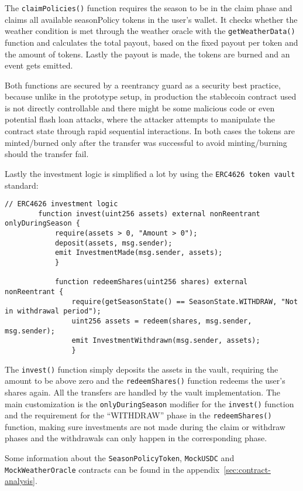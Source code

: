 \documentclass[11pt,a4paper]{article}
\begin{document}
		The \texttt{claimPolicies()} function requires the season to be in the claim phase and claims all available seasonPolicy tokens in the user's wallet.
		It checks whether the weather condition is met through the weather oracle with the \texttt{getWeatherData()} function and calculates the total payout, based on the fixed payout per token and the amount of tokens.
		Lastly the payout is made, the tokens are burned and an event gets emitted.

		Both functions are secured by a reentrancy guard as a security best practice, because unlike in the prototype setup, in production the stablecoin contract used is not directly controllable and there might be some malicious code or even potential flash loan attacks, where the attacker attempts to manipulate the contract state through rapid sequential interactions.
		In both cases the tokens are minted/burned only after the transfer was successful to avoid minting/burning should the transfer fail.

		Lastly the investment logic is simplified a lot by using the \texttt{ERC4626 token vault} standard:

		\begin{lstlisting}[style=soliditystyle, caption={Excerpt: RainyDayFund.sol - Investor Functions},label={lst:contract-invest}]
		// ERC4626 investment logic
		function invest(uint256 assets) external nonReentrant onlyDuringSeason {
			require(assets > 0, "Amount > 0");
			deposit(assets, msg.sender);
			emit InvestmentMade(msg.sender, assets);
			}

			function redeemShares(uint256 shares) external nonReentrant {
				require(getSeasonState() == SeasonState.WITHDRAW, "Not in withdrawal period");
				uint256 assets = redeem(shares, msg.sender, msg.sender);
				emit InvestmentWithdrawn(msg.sender, assets);
				}
		\end{lstlisting}

		The \texttt{invest()} function simply deposits the assets in the vault, requiring the amount to be above zero and the \texttt{redeemShares()} function redeems the user's shares again.
		All the transfers are handled by the vault implementation.
		The main customization is the \texttt{onlyDuringSeason} modifier for the \texttt{invest()} function and the requirement for the \enquote{WITHDRAW} phase in the \texttt{redeemShares()} function, making sure investments are not made during the claim or withdraw phases and the withdrawals can only happen in the corresponding phase.

		Some information about the \texttt{SeasonPolicyToken}, \texttt{MockUSDC} and \texttt{MockWeatherOracle} contracts can be found in the appendix~\ref{sec:contract-analysis}.
\end{document}
